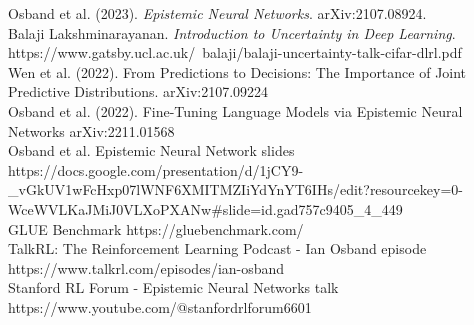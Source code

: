 \documentclass[preview]{standalone}
\begin{document}
Osband et al. (2023). \textit{Epistemic Neural Networks}. arXiv:2107.08924.\\Balaji Lakshminarayanan. \textit{Introduction to Uncertainty in Deep Learning}. https://www.gatsby.ucl.ac.uk/~balaji/balaji-uncertainty-talk-cifar-dlrl.pdf\\Wen et al. (2022). From Predictions to Decisions: The Importance of Joint Predictive Distributions. arXiv:2107.09224\\Osband et al. (2022). Fine-Tuning Language Models via Epistemic Neural Networks arXiv:2211.01568\\Osband et al. Epistemic Neural Network slides https://docs.google.com/presentation/d/1jCY9-_vGkUV1wFcHxp07lWNF6XMITMZIiYdYnYT6IHs/edit?resourcekey=0-WceWVLKaJMiJ0VLXoPXANw#slide=id.gad757c9405_4_449\\GLUE Benchmark https://gluebenchmark.com/\\TalkRL: The Reinforcement Learning Podcast - Ian Osband episode https://www.talkrl.com/episodes/ian-osband\\Stanford RL Forum - Epistemic Neural Networks talk https://www.youtube.com/@stanfordrlforum6601\\
\end{document}
